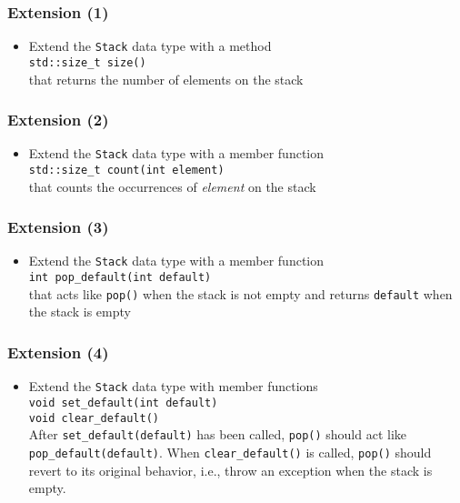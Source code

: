 \documentclass[10pt,aspectratio=169]{beamer}
\begin{document}
\begin{frame}[fragile]
  \frametitle{Extension (1)}  
  \begin{itemize}
  \item Extend the \texttt{Stack} data type with a method\\[1ex]
    \verb!std::size_t size()!\\[1ex]
    that returns the number of elements on the stack
  \end{itemize}
\end{frame}

\begin{frame}[fragile]
  \frametitle{Extension (2)}  
  \begin{itemize}
  \item Extend the \texttt{Stack} data type with a member function\\[1ex]
    \verb!std::size_t count(int element)!\\[1ex]
    that counts the occurrences of \emph{element} on the stack
  \end{itemize}
\end{frame}

\begin{frame}[fragile]
  \frametitle{Extension (3)}  
  \begin{itemize}
  \item Extend the \texttt{Stack} data type with a member function\\[1ex]
    \verb!int pop_default(int default)!\\[1ex]
    that acts like \texttt{pop()} when the stack is not empty and
    returns \texttt{default} when the stack is empty
  \end{itemize}
\end{frame}

\begin{frame}[fragile]
  \frametitle{Extension (4)}  
  \begin{itemize}
  \item Extend the \texttt{Stack} data type with member functions\\[1ex]
    \verb!void set_default(int default)!\\
    \verb!void clear_default()!\\[1ex]
    After \verb!set_default(default)! has been called, \texttt{pop()}
    should act like \verb!pop_default(default)!. When
    \verb!clear_default()! is called, \texttt{pop()} should revert to
    its original behavior, i.e., throw an exception when the stack is
    empty.
  \end{itemize}
\end{frame}
\end{document}
